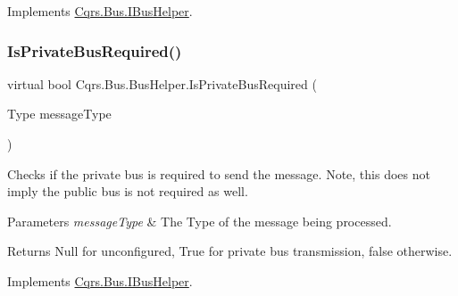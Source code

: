 Implements \hyperlink{interfaceCqrs_1_1Bus_1_1IBusHelper_af73d0d2aa8e98566acb4b2fb13a3e986_af73d0d2aa8e98566acb4b2fb13a3e986}{Cqrs.\+Bus.\+I\+Bus\+Helper}.

\mbox{\label{classCqrs_1_1Bus_1_1BusHelper_aec31c15f8f81de5079d52de2bfcbc718_aec31c15f8f81de5079d52de2bfcbc718}} 
\subsubsection{\texorpdfstring{Is\+Private\+Bus\+Required()}{IsPrivateBusRequired()}}
{\footnotesize\ttfamily virtual bool Cqrs.\+Bus.\+Bus\+Helper.\+Is\+Private\+Bus\+Required (\begin{DoxyParamCaption}\item[{Type}]{message\+Type }\end{DoxyParamCaption})\hspace{0.3cm}{\ttfamily [virtual]}}



Checks if the private bus is required to send the message. Note, this does not imply the public bus is not required as well. 


\begin{DoxyParams}{Parameters}
{\em message\+Type} & The Type of the message being processed.\\
\hline
\end{DoxyParams}
\begin{DoxyReturn}{Returns}
Null for unconfigured, True for private bus transmission, false otherwise.
\end{DoxyReturn}


Implements \hyperlink{interfaceCqrs_1_1Bus_1_1IBusHelper_af73d5bb5f33e9d8422309f6b3ac73369_af73d5bb5f33e9d8422309f6b3ac73369}{Cqrs.\+Bus.\+I\+Bus\+Helper}.

\mbox{\label{classCqrs_1_1Bus_1_1BusHelper_ac5d953a97736424eff59b6033351be46_ac5d953a97736424eff59b6033351be46}} 
